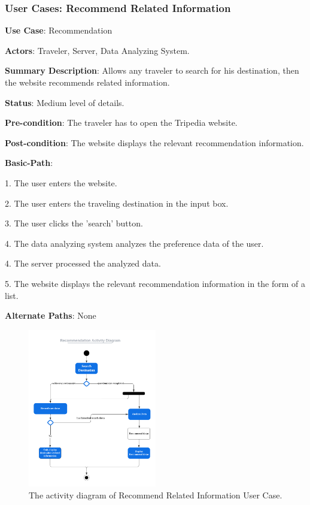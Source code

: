 \documentclass[conference]{IEEEtran}
\begin{document}
\subsubsection{User Cases: Recommend Related Information}

\textbf{ }

\textbf{Use Case}: Recommendation

\textbf{Actors}: Traveler, Server, Data Analyzing System.

\textbf{Summary Description}: Allows any traveler to search for his destination, then the website recommends related information.

\textbf{Status}: Medium level of details.

\textbf{Pre-condition}: The traveler has to open the Tripedia website.

\textbf{Post-condition}: The website displays the relevant recommendation information.

\textbf{Basic-Path}:

1. The user enters the website.

2. The user enters the traveling destination in the input box.

3. The user clicks the 'search' button.

4. The data analyzing system analyzes the preference data of the user.

4. The server processed the analyzed data.

5. The website displays the relevant recommendation information in the form of a list.

\textbf{Alternate Paths}:  None

\begin{figure}[htbp]
	\centerline{\includegraphics[width=0.5\textwidth]{Recommendation_Activity_diagram.pdf}}
	\caption{The activity diagram of Recommend Related Information User Case.}
	\label{fig4}
\end{figure}
\end{document}
